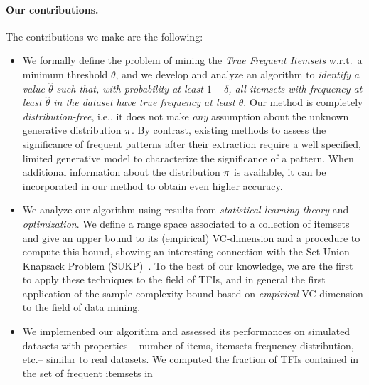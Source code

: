 \paragraph*{Our contributions.}
The contributions we make are the following:
\begin{itemize}
  \item We formally define the problem of mining the \emph{True Frequent
    Itemsets} w.r.t.~a minimum threshold $\theta$, and we develop and analyze an
    algorithm to \emph{identify a value $\hat{\theta}$ such that, with
    probability at least $1-\delta$, all itemsets
with frequency at least $\hat{\theta}$ in the dataset have true frequency
at least $\theta$}. Our method is completely \emph{distribution-free}, i.e., it
does not make \emph{any} assumption about the unknown generative distribution
$\pi$. %
By contrast, existing methods to assess the significance of frequent patterns after their
extraction %
require a well specified, limited generative model to characterize the
significance of a pattern. When %
additional information about the distribution $\pi$ is available, it can be
incorporated in our method to obtain even higher accuracy.
\item %
We analyze our algorithm using results from \emph{statistical learning theory} and \emph{optimization}. %
We define a range space associated to a collection of itemsets and give an upper
bound to its (empirical) VC-dimension and a procedure to compute this bound,
showing an interesting connection with the Set-Union
Knapsack Problem (SUKP)~\citep{GoldschmidtNY94}. 
To the best of our knowledge, we are the first to apply these
techniques to the field of TFIs, and in general the first application of the
sample complexity bound based on \emph{empirical} VC-dimension
to the field of data mining. 
\item We implemented our algorithm and assessed its performances on simulated
  datasets with properties -- number of items, itemsets frequency distribution,
  etc.-- similar to real datasets. We computed the fraction of TFIs contained in the set of frequent itemsets in

\end{itemize}
